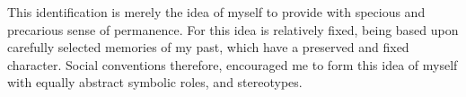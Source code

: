 \documentclass[10pt,a4paper,ragged2e,withhyper]{altacv}
\begin{document}




\makecvheader




\begin{raggedright}
This identification is merely the idea of myself to provide with
specious and precarious sense of permanence. For this idea is
relatively fixed, being based upon carefully selected memories of
my past, which have a preserved and fixed character. Social
conventions therefore, encouraged me to form this idea of myself
with equally abstract symbolic roles, and stereotypes. 
\end{raggedright}
\end{document}
